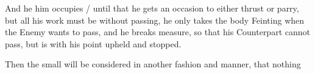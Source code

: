 And he him occupies / until that he gets an occasion to either thrust
or parry, but all his work must be without passing, he only takes the
body Feinting when the
Enemy wants to pass, and he breaks measure, so that his Counterpart
cannot pass, but is with his point upheld and stopped.

Then the small will be considered in another fashion and manner, that
nothing
